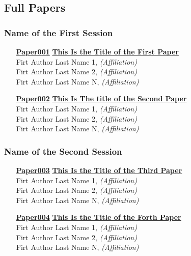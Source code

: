 
\subsection{Full Papers}
\subsubsection{Name of the First Session}

\begin{enumerate}
\item[\href{https://doi.org/10.1145/1122445.1122456}{\textbf{Paper001}}]
\href{https://doi.org/10.1145/1122445.1122456}{\textbf{This Is the Title of the First Paper}}\\
Firt Author Last Name 1, \emph{(Affiliation)}\\
Firt Author Last Name 2, \emph{(Affiliation)}\\
Firt Author Last Name N, \emph{(Affiliation)}\\

\item[\href{https://doi.org/10.1145/1122445.1122456}{\textbf{Paper002}}]
\href{https://doi.org/10.1145/1122445.1122456}{\textbf{This Is The title of the Second Paper}}\\
Firt Author Last Name 1, \emph{(Affiliation)}\\
Firt Author Last Name 2, \emph{(Affiliation)}\\
Firt Author Last Name N, \emph{(Affiliation)}\\
\end{enumerate}

\subsubsection{Name of the Second Session}
\begin{enumerate}
\item[\href{https://doi.org/10.1145/1122445.1122456}{\textbf{Paper003}}]
\href{https://doi.org/10.1145/1122445.1122456}{\textbf{This Is the Title of the Third Paper}}\\
Firt Author Last Name 1, \emph{(Affiliation)}\\
Firt Author Last Name 2, \emph{(Affiliation)}\\
Firt Author Last Name N, \emph{(Affiliation)}\\

\item[\href{https://doi.org/10.1145/1122445.1122456}{\textbf{Paper004}}]
\href{https://doi.org/10.1145/1122445.1122456}{\textbf{This Is the Title of the Forth Paper}}\\
Firt Author Last Name 1, \emph{(Affiliation)}\\
Firt Author Last Name 2, \emph{(Affiliation)}\\
Firt Author Last Name N, \emph{(Affiliation)}\\
\end{enumerate}


